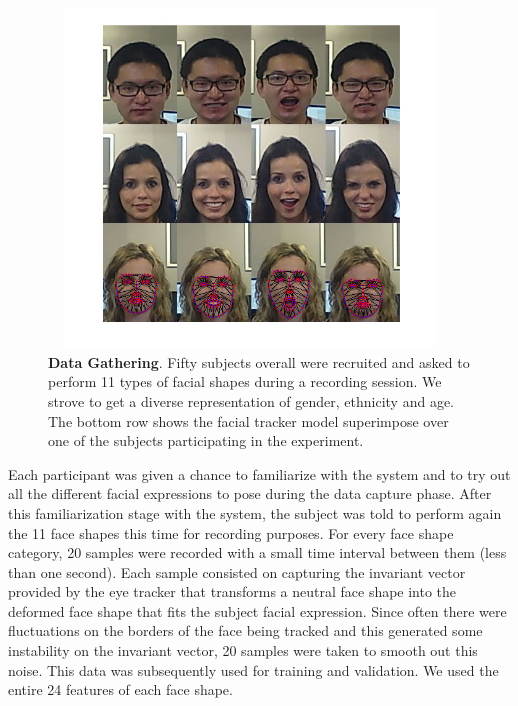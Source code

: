 \documentclass[]{article}
\begin{document}
\begin{figure}[ht]
\begin{center}
\vspace{-3mm}
\includegraphics[width=0.95\textwidth,height=90mm]{figures/dataExtrationExamples.jpg}
\end{center}
\caption{\textbf{Data Gathering}. Fifty subjects overall were recruited and asked to perform 11 types of facial shapes during a 
recording session. We strove to  get a diverse representation of gender, ethnicity and age. The bottom row shows the facial tracker 
model superimpose over one of the subjects participating in the experiment.}
\label{comparationBetweenFaces}
\end{figure}


Each participant was given a chance to familiarize with the system and to try out all the different facial expressions
to pose during the data capture phase. After this familiarization stage with the system, the subject was told to perform
again the 11 face shapes this time for recording purposes. For every face shape category, 20 samples were recorded with
a small time interval between them (less than one second). Each sample consisted on capturing the invariant vector
provided by the eye tracker that transforms a neutral face shape into the deformed face shape that fits the subject
facial expression. Since often there were fluctuations on the borders of the face being tracked and this generated some
instability on the invariant vector, 20 samples were taken to smooth out this noise. This data was subsequently
used for training and validation. We used the entire 24 features of each face shape. 
\end{document}
